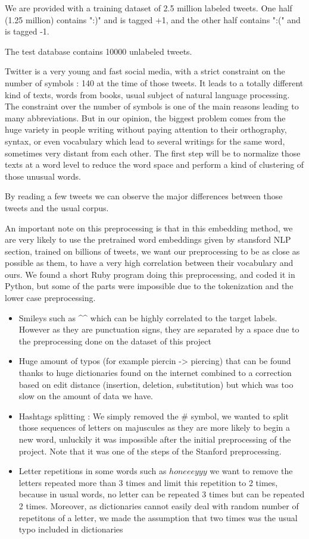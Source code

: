 \documentclass[10pt,conference,compsocconf]{IEEEtran}
\begin{document}
We are provided with a training dataset of 2.5 million labeled tweets. One half (1.25 million) contains ":)" and is tagged +1, and the other half contains ":(" and is tagged -1.

The test database contains 10000 unlabeled tweets.

Twitter is a very young and fast social media, with a strict constraint on the number of symbols : 140 at the time of those tweets. It leads to a totally different kind of texts, words from books, usual subject of natural language processing. The constraint over the number of symbols is one of the main reasons leading to many abbreviations. But in our opinion, the biggest problem comes from the huge variety in people writing without paying attention to their orthography, syntax, or even vocabulary which lead to several writings for the same word, sometimes very distant from each other. The first step will be to normalize those texts at a word level to reduce the word space and perform a kind of clustering of those unusual words.

By reading a few tweets we can observe the major differences between those tweets and the usual corpus.

An important note on this preprocessing is that in this embedding method, we are very likely to use the pretrained word embeddings given by stansford NLP section, trained on billions of tweets, we want our preprocessing to be as close as possible as them, to have a very high correlation between their vocabulary and ours. We found a short Ruby program doing this preprocessing, and coded it in Python, but some of the parts were impossible due to the tokenization and the lower case preprocessing.

\begin{itemize}
    \item Smileys such as \^{}\^{}  which can be highly correlated to the target labels. However as they are punctuation signs, they are separated by a space due to the preprocessing done on the dataset of this project
    \item Huge amount of typos (for example piercin -> piercing) that can be found thanks to huge dictionaries found on the internet combined to a correction based on edit distance (insertion, deletion, substitution) but which was too slow on the amount of data we have.
    \item Hashtags splitting : We simply removed the \# symbol, we wanted to split those sequences of letters on majuscules as they are more likely to begin a new word, unluckily it was impossible after the initial preprocessing of the project. Note that it was one of the steps of the Stanford preprocessing.
    \item Letter repetitions in some words such as $honeeeyyy$ we want to remove the letters repeated more than 3 times and limit this repetition to 2 times, because in usual words, no letter can be repeated 3 times but can be repeated 2 times. Moreover, as dictionaries cannot easily deal with random number of repetitons of a letter, we made the assumption that two times was the usual typo included in dictionaries
\end{itemize}
\end{document}
